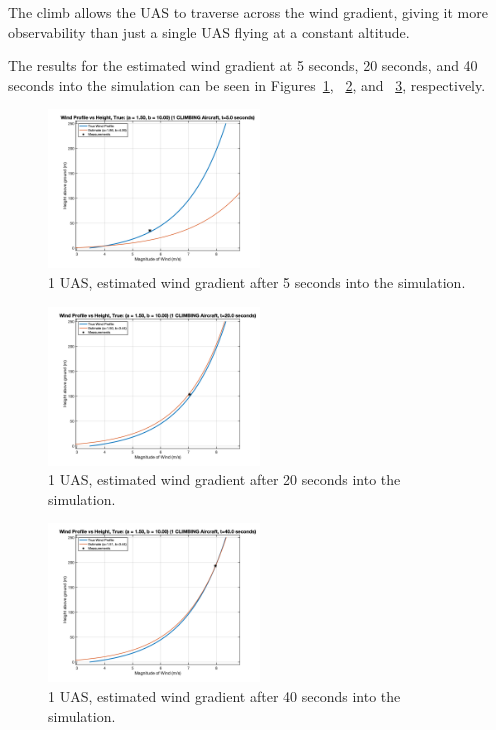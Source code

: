 The climb allows the UAS to traverse across the wind gradient, giving it more observability than just a single UAS flying at a constant altitude.

The results for the estimated wind gradient at 5 seconds, 20 seconds, and 40 seconds into the simulation can be seen in Figures~\ref{fig:uas_traj_one_climb_5}, ~\ref{fig:uas_traj_one_climb_20}, and ~\ref{fig:uas_traj_one_climb_40}, respectively.

\begin{figure}[h]
    \centering
    \includegraphics[width=0.5\textwidth]{images/climbing_5_sec.png}
    \caption{1 UAS, estimated wind gradient after 5 seconds into the simulation.}
    \label{fig:uas_traj_one_climb_5}
\end{figure}

\begin{figure}[h]
    \centering
    \includegraphics[width=0.5\textwidth]{images/climbing_20_sec.png}
    \caption{1 UAS, estimated wind gradient after 20 seconds into the simulation.}
    \label{fig:uas_traj_one_climb_20}
\end{figure}

\begin{figure}[h]
    \centering
    \includegraphics[width=0.5\textwidth]{images/climbing_40_sec.png}
    \caption{1 UAS, estimated wind gradient after 40 seconds into the simulation.}
    \label{fig:uas_traj_one_climb_40}
\end{figure}

